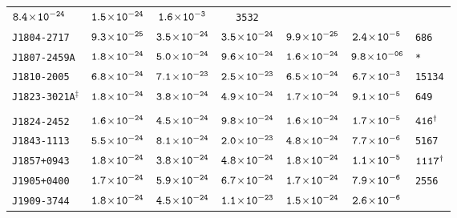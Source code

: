 \begin{longtable}{ l | c | c | c | c | c | l }
\scriptsize{$\tt{8.4\!\times\!10^{-24}}$} &\scriptsize{$\tt{1.5\!\times\!10^{-24}}$} & \scriptsize{$\tt{1.6\!\times\!10^{-3}}$} &
\scriptsize{\tt{3532}} \\[-16pt] 
\scriptsize{\tt{J1804-2717}} & \scriptsize{$\tt{9.3\!\times\!10^{-25}}$} & \scriptsize{$\tt{3.5\!\times\!10^{-24}}$} &
\scriptsize{$\tt{3.5\!\times\!10^{-24}}$} &\scriptsize{$\tt{9.9\!\times\!10^{-25}}$} & \scriptsize{$\tt{2.4\!\times\!10^{-5}}$} &
\scriptsize{\tt{686}} \\[-16pt] 
\scriptsize{\tt{J1807-2459A}} & \scriptsize{$\tt{1.8\!\times\!10^{-24}}$} & \scriptsize{$\tt{5.0\!\times\!10^{-24}}$} &
\scriptsize{$\tt{9.6\!\times\!10^{-24}}$} & \scriptsize{$\tt{1.6\!\times\!10^{-24}}$} & \scriptsize{$\tt{9.8\!\times\!10^{-06}}$}
& \scriptsize{\tt{*}} \\[-16pt]
\scriptsize{\tt{J1810-2005}} & \scriptsize{$\tt{6.8\!\times\!10^{-24}}$} & \scriptsize{$\tt{7.1\!\times\!10^{-23}}$} &
\scriptsize{$\tt{2.5\!\times\!10^{-23}}$} &\scriptsize{$\tt{6.5\!\times\!10^{-24}}$} & \scriptsize{$\tt{6.7\!\times\!10^{-3}}$} &
\scriptsize{\tt{15134}} \\[-16pt] 
\scriptsize{\tt{J1823-3021A}$^{\ddagger}$} & \scriptsize{$\tt{1.8\!\times\!10^{-24}}$} &
\scriptsize{$\tt{3.8\!\times\!10^{-24}}$} & \scriptsize{$\tt{4.9\!\times\!10^{-24}}$} &\scriptsize{$\tt{1.7\!\times\!10^{-24}}$} &
\scriptsize{$\tt{9.1\!\times\!10^{-5}}$} & \scriptsize{\tt{649}} \\[-16pt]
\\[-20pt]
\scriptsize{\tt{J1824-2452}} & \scriptsize{$\tt{1.6\!\times\!10^{-24}}$} & \scriptsize{$\tt{4.5\!\times\!10^{-24}}$} &
\scriptsize{$\tt{9.8\!\times\!10^{-24}}$} & \scriptsize{$\tt{1.6\!\times\!10^{-24}}$} & \scriptsize{$\tt{1.7\!\times\!10^{-5}}$} &
\scriptsize{$\tt{416^{\dagger}}$} \\[-16pt] 
\scriptsize{\tt{J1843-1113}} & \scriptsize{$\tt{5.5\!\times\!10^{-24}}$} & \scriptsize{$\tt{8.1\!\times\!10^{-24}}$} &
\scriptsize{$\tt{2.0\!\times\!10^{-23}}$} &\scriptsize{$\tt{4.8\!\times\!10^{-24}}$} & \scriptsize{$\tt{7.7\!\times\!10^{-6}}$} &
\scriptsize{\tt{5167}} \\[-16pt] 
\scriptsize{\tt{J1857+0943}} & \scriptsize{$\tt{1.8\!\times\!10^{-24}}$} & \scriptsize{$\tt{3.8\!\times\!10^{-24}}$} &
\scriptsize{$\tt{4.8\!\times\!10^{-24}}$} & \scriptsize{$\tt{1.8\!\times\!10^{-24}}$} & \scriptsize{$\tt{1.1\!\times\!10^{-5}}$} &
\scriptsize{$\tt{1117^{\dagger}}$} \\[-16pt] 
\scriptsize{\tt{J1905+0400}} & \scriptsize{$\tt{1.7\!\times\!10^{-24}}$} & \scriptsize{$\tt{5.9\!\times\!10^{-24}}$} &
\scriptsize{$\tt{6.7\!\times\!10^{-24}}$} &\scriptsize{$\tt{1.7\!\times\!10^{-24}}$} & \scriptsize{$\tt{7.9\!\times\!10^{-6}}$} &
\scriptsize{\tt{2556}} \\[-16pt] 
\scriptsize{\tt{J1909-3744}} & \scriptsize{$\tt{1.8\!\times\!10^{-24}}$} & \scriptsize{$\tt{4.5\!\times\!10^{-24}}$} &
\scriptsize{$\tt{1.1\!\times\!10^{-23}}$} & \scriptsize{$\tt{1.5\!\times\!10^{-24}}$} & \scriptsize{$\tt{2.6\!\times\!10^{-6}}$} &

\end{longtable}
